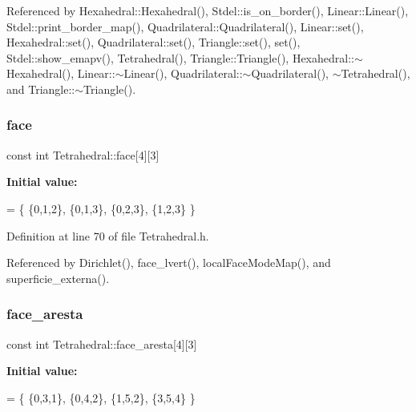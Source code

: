 Referenced by Hexahedral\+::\+Hexahedral(), Stdel\+::is\+\_\+on\+\_\+border(), Linear\+::\+Linear(), Stdel\+::print\+\_\+border\+\_\+map(), Quadrilateral\+::\+Quadrilateral(), Linear\+::set(), Hexahedral\+::set(), Quadrilateral\+::set(), Triangle\+::set(), set(), Stdel\+::show\+\_\+emapv(), Tetrahedral(), Triangle\+::\+Triangle(), Hexahedral\+::$\sim$\+Hexahedral(), Linear\+::$\sim$\+Linear(), Quadrilateral\+::$\sim$\+Quadrilateral(), $\sim$\+Tetrahedral(), and Triangle\+::$\sim$\+Triangle().

\mbox{\label{classTetrahedral_a3acfd46f1a82598f1c414ed2b943c27b}} 
\subsubsection{\texorpdfstring{face}{face}}
{\footnotesize\ttfamily const int Tetrahedral\+::face\mbox{[}4\mbox{]}\mbox{[}3\mbox{]}\hspace{0.3cm}{\ttfamily [private]}}

{\bfseries Initial value\+:}
\begin{DoxyCode}
= 
  \{
    \{0,1,2\}, 
    \{0,1,3\}, 
    \{0,2,3\}, 
    \{1,2,3\}  
  \}
\end{DoxyCode}


Definition at line 70 of file Tetrahedral.\+h.



Referenced by Dirichlet(), face\+\_\+lvert(), local\+Face\+Mode\+Map(), and superficie\+\_\+externa().

\mbox{\label{classTetrahedral_a4c77419317e33dbe6defe1a0165e6cfa}} 
\subsubsection{\texorpdfstring{face\+\_\+aresta}{face\_aresta}}
{\footnotesize\ttfamily const int Tetrahedral\+::face\+\_\+aresta\mbox{[}4\mbox{]}\mbox{[}3\mbox{]}\hspace{0.3cm}{\ttfamily [private]}}

{\bfseries Initial value\+:}
\begin{DoxyCode}
= 
  \{
    \{0,3,1\}, 
    \{0,4,2\}, 
    \{1,5,2\}, 
    \{3,5,4\}  
  \}
\end{DoxyCode}


